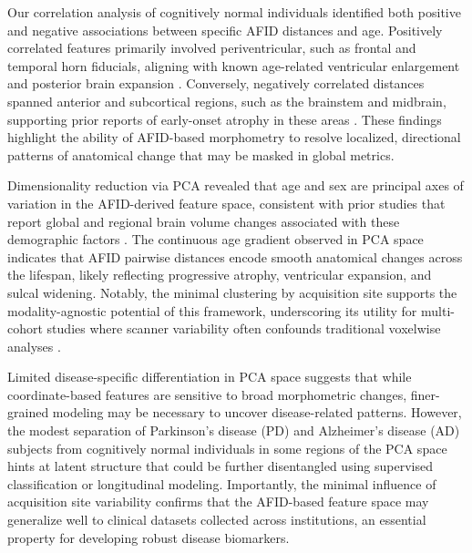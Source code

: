 Our correlation analysis of cognitively normal individuals identified both positive and negative associations between specific AFID distances and age. Positively correlated features primarily involved periventricular, such as frontal and temporal horn fiducials, aligning with known age-related ventricular enlargement and posterior brain expansion \cite{Resnick2003-je}. Conversely, negatively correlated distances spanned anterior and subcortical regions, such as the brainstem and midbrain, supporting prior reports of early-onset atrophy in these areas \cite{Raz2005-jr}. These findings highlight the ability of AFID-based morphometry to resolve localized, directional patterns of anatomical change that may be masked in global metrics.

Dimensionality reduction via PCA revealed that age and sex are principal axes of variation in the AFID-derived feature space, consistent with prior studies that report global and regional brain volume changes associated with these demographic factors \cite{Fjell2010-aq, Ritchie2018-df}. The continuous age gradient observed in PCA space indicates that AFID pairwise distances encode smooth anatomical changes across the lifespan, likely reflecting progressive atrophy, ventricular expansion, and sulcal widening. Notably, the minimal clustering by acquisition site supports the modality-agnostic potential of this framework, underscoring its utility for multi-cohort studies where scanner variability often confounds traditional voxelwise analyses \cite{Fortin2018-ke}.

Limited disease-specific differentiation in PCA space suggests that while coordinate-based features are sensitive to broad morphometric changes, finer-grained modeling may be necessary to uncover disease-related patterns. However, the modest separation of Parkinson’s disease (PD) and Alzheimer’s disease (AD) subjects from cognitively normal individuals in some regions of the PCA space hints at latent structure that could be further disentangled using supervised classification or longitudinal modeling. Importantly, the minimal influence of acquisition site variability confirms that the AFID-based feature space may generalize well to clinical datasets collected across institutions, an essential property for developing robust disease biomarkers.

